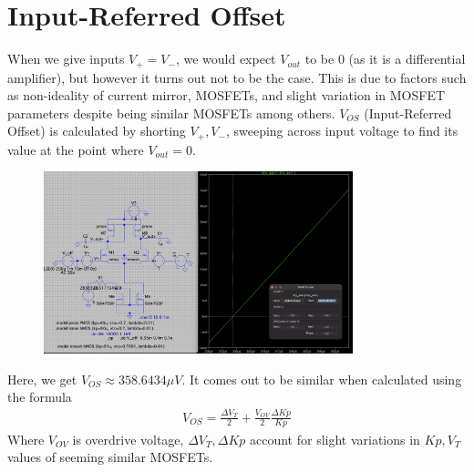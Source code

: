 \documentclass[12pt,a4paper]{article}
\begin{document}
\section{Input-Referred Offset}
When we give inputs $V_+=V_-$, we would expect $V_{out}$ to be 0 (as it is a differential amplifier), but however it turns out not to be the case. This is due to factors such as non-ideality of current mirror, MOSFETs, and slight variation in MOSFET parameters despite being similar MOSFETs among others.\newline
$V_{OS}$ (Input-Referred Offset) is calculated by shorting $V_+, V_-$, sweeping across input voltage to find its value at the point where $V_{out}=0$.
\begin{figure}[H]
    \centering
    \includegraphics[width=0.8\textwidth]{Simluations/Experiment_4/figs/SOME_FUCKING_SHIT.png}
\end{figure}
Here, we get $V_{OS} \approx 358.6434\mu V$. It comes out to be similar when calculated using the formula 
\begin{align*}
    V_{OS} = \frac{\Delta V_T}{2} + \frac{V_{OV}}{2}\frac{\Delta Kp}{Kp}
\end{align*}
Where $V_{OV}$ is overdrive voltage, $\Delta V_T, \Delta Kp$ account for slight variations in $Kp, V_T$ values of seeming similar MOSFETs.
\end{document}
